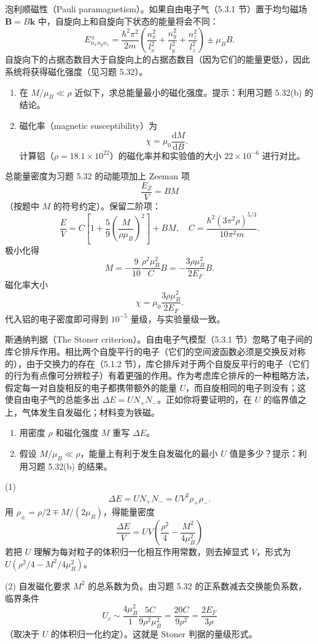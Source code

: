 \begin{question}
泡利顺磁性（Pauli paramagnetism）。如果自由电子气（5.3.1 节）置于均匀磁场 $\mathbf B=B\hat{\mathbf k}$ 中，自旋向上和自旋向下状态的能量将会不同：
\[
E_{n_xn_yn_z}^{\pm}=\frac{\hbar^2\pi^2}{2m}\left(\frac{n_x^2}{l_x^2}+\frac{n_y^2}{l_y^2}+\frac{n_z^2}{l_z^2}\right)\pm \mu_B B.
\]
自旋向下的占据态数目大于自旋向上的占据态数目（因为它们的能量更低），因此系统将获得磁化强度（见习题 5.32）。
\begin{enumerate}
\item 在 $M/\mu_B\ll\rho$ 近似下，求总能量最小的磁化强度。提示：利用习题 5.32(b) 的结论。
\item 磁化率（magnetic susceptibility）为
\[
\chi=\mu_0\frac{\mathrm dM}{\mathrm dB}.
\]
计算铝（$\rho=18.1\times10^{22}$）的磁化率并和实验值的大小 $22\times10^{-6}$ 进行对比。
\end{enumerate}
\end{question}
\begin{solution}

总能量密度为习题 5.32 的动能项加上 Zeeman 项
\[
\frac{E_Z}{V}=BM
\]
（按题中 $M$ 的符号约定）。保留二阶项：
\[
\frac EV=C\left[1+\frac59\left(\frac{M}{\rho\mu_B}\right)^2\right]+BM,
\quad C=\frac{\hbar^2(3\pi^2\rho)^{5/3}}{10\pi^2m}.
\]
极小化得
\[
M=-\frac{9}{10}\frac{\rho^2\mu_B^2}{C}B
=-\frac{3\rho\mu_B^2}{2E_F}B.
\]
磁化率大小
\[
\chi=\mu_0\frac{3\rho\mu_B^2}{2E_F}.
\]
代入铝的电子密度即可得到 $10^{-5}$ 量级，与实验量级一致。

\end{solution}

\begin{question}
斯通纳判据（The Stoner criterion）。自由电子气模型（5.3.1 节）忽略了电子间的库仑排斥作用。相比两个自旋平行的电子（它们的空间波函数必须是交换反对称的），由于交换力的存在（5.1.2 节），库仑排斥对于两个自旋反平行的电子（它们的行为有点像可分辨粒子）有着更强的作用。作为考虑库仑排斥的一种粗略方法，假定每一对自旋相反的电子都携带额外的能量 $U$，而自旋相同的电子则没有；这使自由电子气的总能多出 $\Delta E=U N_+N_-$。正如你将要证明的，在 $U$ 的临界值之上，气体发生自发磁化；材料变为铁磁。
\begin{enumerate}
\item 用密度 $\rho$ 和磁化强度 $M$ 重写 $\Delta E$。
\item 假设 $M/\mu_B\ll\rho$，能量上有利于发生自发磁化的最小 $U$ 值是多少？提示：利用习题 5.32(b) 的结果。
\end{enumerate}
\end{question}
\begin{solution}

(1) 
\[
\Delta E=UN_+N_-=UV^2\rho_+\rho_-.
\]
用 $\rho_\pm=\rho/2\mp M/(2\mu_B)$，得能量密度
\[
\frac{\Delta E}{V}=UV\left(\frac{\rho^2}{4}-\frac{M^2}{4\mu_B^2}\right)
\]
若把 $U$ 理解为每对粒子的体积归一化相互作用常数，则去掉显式 $V$，形式为 $U(\rho^2/4-M^2/4\mu_B^2)$。

(2) 自发磁化要求 $M^2$ 的总系数为负。由习题 5.32 的正系数减去交换能负系数，临界条件
\[
U_c\sim \frac{4\mu_B^2}{1}\frac{5C}{9\rho^2\mu_B^2}
=\frac{20C}{9\rho^2}
=\frac{2E_F}{3\rho}
\]
（取决于 $U$ 的体积归一化约定）。这就是 Stoner 判据的量级形式。

\end{solution}


